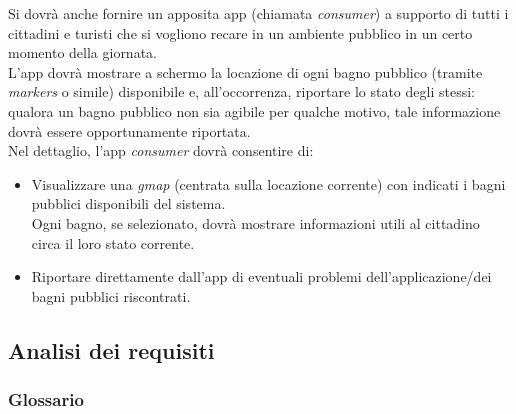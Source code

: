\documentclass[12pt]{article}
\begin{document}
Si dovrà anche fornire un apposita app (chiamata \textit{consumer}) a supporto di tutti i cittadini e turisti che si vogliono recare in un ambiente pubblico in un certo momento della giornata.\\
L'app dovrà mostrare a schermo la locazione di ogni bagno pubblico (tramite \textit{markers} o simile) disponibile e, all'occorrenza, riportare lo stato degli stessi: qualora un bagno pubblico non sia agibile per qualche motivo, tale informazione dovrà essere opportunamente riportata.\\
Nel dettaglio, l'app \textit{consumer} dovrà consentire di:
\begin{itemize}
\item Visualizzare una \textit{gmap} (centrata sulla locazione corrente) con indicati i bagni pubblici disponibili del sistema.\\Ogni bagno, se selezionato, dovrà mostrare informazioni utili al cittadino circa il loro stato corrente.
\item Riportare direttamente dall'app di eventuali problemi dell'applicazione/dei bagni pubblici riscontrati.
\end{itemize}
\newpage
\subsection{Analisi dei requisiti}
\subsubsection{Glossario}
\end{document}
